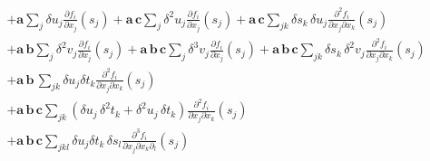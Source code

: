 \begin{align*}
\\
&+ 
\mathbf{a} \sum_{j} \delta u_{j} \frac{ \partial f_{i} }{ \partial x_{j} } \! \left( s_{j} \right)
+ \mathbf{a} \, \mathbf{c} \sum_{j} \delta^{2} u_{j} 
\frac{ \partial f_{i} }{ \partial x_{j} } \! \left( s_{j} \right) 
+ \mathbf{a} \, \mathbf{c} \sum_{jk} \delta s_{k} \, \delta u_{j} 
\frac{ \partial^{2} f_{i} }{ \partial x_{j} \partial x_{k} } \! \left( s_{j} \right)
\\
&+ 
\mathbf{a} \, \mathbf{b} \sum_{j} \delta^{2} v_{j} 
\frac{ \partial f_{i} }{ \partial x_{j} } \! \left( s_{j} \right)
+ \mathbf{a} \, \mathbf{b} \, \mathbf{c} \sum_{j} \delta^{3} v_{j} 
\frac{ \partial f_{i} }{ \partial x_{j} } \! \left( s_{j} \right) 
+ \mathbf{a} \, \mathbf{b} \, \mathbf{c} \sum_{jk} \delta s_{k} \, \delta^{2} v_{j} 
\frac{ \partial^{2} f_{i} }{ \partial x_{j} \partial x_{k} } \! \left( s_{j} \right)
\\
&+ 
\mathbf{a} \, \mathbf{b} \, \sum_{jk} 
\delta u_{j} \delta t_{k} \frac{ \partial^{2} f_{i} }{ \partial x_{j} \partial x_{k} } \! \left( s_{j} \right)
\\
&+ \mathbf{a} \, \mathbf{b} \, \mathbf{c} \sum_{jk}
\left( \delta u_{j} \, \delta^{2} t_{k} + \delta^{2} u_{j} \, \delta t_{k}  \right)
\frac{ \partial^{2} f_{i} }{ \partial x_{j} \partial x_{k} } \! \left( s_{j} \right) 
\\
&+
\mathbf{a} \, \mathbf{b} \, \mathbf{c} \sum_{jkl}
\delta u_{j} \delta t_{k} \, \delta s_{l} 
\frac{ \partial^{3} f_{i} }{ \partial x_{j} \partial x_{k} \partial_{l} } \! \left( s_{j} \right)
\\
%
\end{align*}

